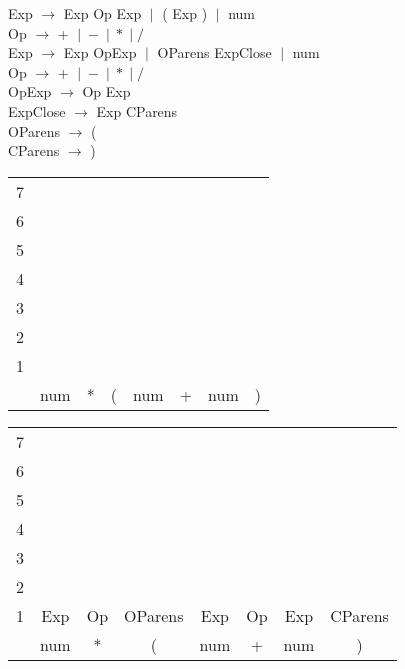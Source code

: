 \documentclass[fleqn]{article}
\begin{document}
\noindent Exp $\rightarrow $ Exp Op Exp $\; | \;$ ( Exp ) $ \; | \;$ num \\
Op $\rightarrow $ + $\; | \; - \; | \; * \; | \; / $ \\

\noindent 
Exp $\rightarrow $ Exp OpExp $\; | \; $ OParens ExpClose $\; | \; $ num \\
Op $\rightarrow $ + $\; | \; - \; | \; * \; | \; / $ \\
OpExp $\rightarrow $ Op Exp \\
ExpClose $\rightarrow $ Exp CParens \\
OParens $\rightarrow $ (\\
CParens $\rightarrow $ )\\



\begin{tabular}{r | c | c | c | c  | c | c | c|}
\cline{2-2}
7 &\\\cline{2-3}
6 && \\\cline{2-4}
5 && & \\\cline{2-5}
4 && & & \\\cline{2-6}
3 && & & & \\\cline{2-7}
2 && & & & & \\\cline{2-8}
1 & & & & & & & \\\cline{2-8}
& num & * & ( & num & + & num & ) \\\cline{2-8}
\cline {2-8}

\end{tabular}

\vspace{0.5in}


\begin{tabular}{r | c | c | c | c  | c | c | c|}
\cline{2-2}
7 &\\\cline{2-3}
6 && \\\cline{2-4}
5 && & \\\cline{2-5}
4 && & & \\\cline{2-6}
3 && & & & \\\cline{2-7}
2 && & & & & \\\cline{2-8}
1 & \cellcolor{blue!25}Exp & Op & OParens & Exp & Op & Exp & CParens \\\cline{2-8}
& \cellcolor{blue!25}num & * & ( & num & + & num & ) \\\cline{2-8}
\cline {2-8}

\end{tabular}
\end{document}
